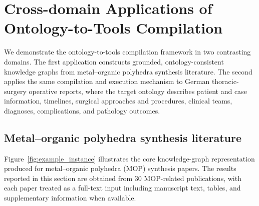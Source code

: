 



\section{Cross-domain Applications of Ontology-to-Tools Compilation}\label{sec:application}
We demonstrate the ontology-to-tools compilation framework in two contrasting domains. The first application constructs grounded, ontology-consistent knowledge graphs from metal--organic polyhedra synthesis literature. The second applies the same compilation and execution mechanism to German thoracic-surgery operative reports, where the target ontology describes patient and case information, timelines, surgical approaches and procedures, clinical teams, diagnoses, complications, and pathology outcomes.

\subsection{Metal--organic polyhedra synthesis literature}
Figure~\ref{fig:example_instance} illustrates the core knowledge-graph representation produced for metal--organic polyhedra (MOP) synthesis papers. The results reported in this section are obtained from 30 MOP-related publications, with each paper treated as a full-text input including manuscript text, tables, and supplementary information when available.

